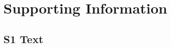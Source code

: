 \documentclass[10pt,letterpaper]{article}
\begin{document}


% 
% 
% 
% 
% 

\section*{Supporting Information}

\subsection*{S1 Text}
\label{apx:elliptic_integrals}
\end{document}
